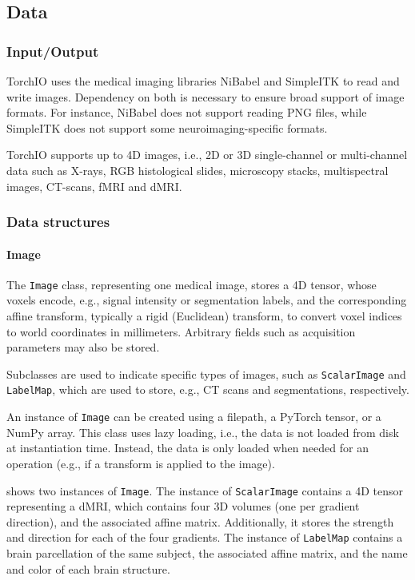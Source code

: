 \subsection{Data}

\subsubsection{Input/Output}

TorchIO uses the medical imaging libraries NiBabel and SimpleITK to read and write images.
Dependency on both is necessary to ensure broad support of image formats.
For instance, NiBabel does not support reading \ac{PNG} files, while SimpleITK does not support some neuroimaging-specific formats.

TorchIO supports up to 4D images, i.e., 2D or 3D single-channel or multi-channel data such as X-rays, \ac{RGB} histological slides, microscopy stacks, multispectral images, \ac{CT}-scans, \ac{fMRI} and \ac{dMRI}.


\subsubsection{Data structures}
\label{sec:data_structures}

\paragraph{Image}

The \texttt{Image} class, representing one medical image, stores a 4D tensor, whose voxels encode, e.g., signal intensity or segmentation labels, and the corresponding affine transform, typically a rigid (Euclidean) transform, to convert voxel indices to world coordinates in millimeters.
Arbitrary fields such as acquisition parameters may also be stored.

Subclasses are used to indicate specific types of images, such as \texttt{ScalarImage} and \texttt{LabelMap}, which are used to store, e.g., \ac{CT} scans and segmentations, respectively.

An instance of \texttt{Image} can be created using a filepath, a PyTorch tensor, or a NumPy array.
This class uses lazy loading, i.e., the data is not loaded from disk at instantiation time.
Instead, the data is only loaded when needed for an operation (e.g., if a transform is applied to the image).

 shows two instances of \texttt{Image}.
The instance of \texttt{ScalarImage} contains a 4D tensor representing a \ac{dMRI}, which contains four 3D volumes (one per gradient direction), and the associated affine matrix.
Additionally, it stores the strength and direction for each of the four gradients.
The instance of \texttt{LabelMap} contains a brain parcellation of the same subject, the associated affine matrix, and the name and color of each brain structure.

